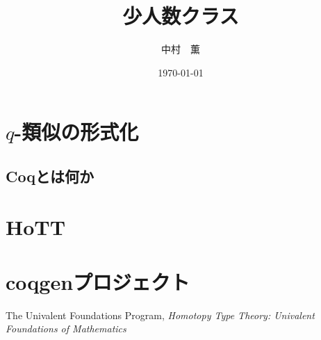 \documentclass[11pt]{jarticle}
\theoremstyle{mystyle}
\newcommand{\0}{\textbf{0}}
\newcommand{\1}{\textbf{1}}
\newcommand{\2}{\textbf{2}}
\begin{document}
\title{少人数クラス}
\author{中村　薫}
\date{\today}
\maketitle
\tableofcontents
\section{$q$-類似の形式化}
\subsection{Coqとは何か}
\section{HoTT}
\section{coqgenプロジェクト}
\begin{thebibliography}{9}
     The Univalent Foundations Program, 
        {\it{Homotopy Type Theory: Univalent Foundations of Mathematics}}
  \end{thebibliography}
\end{document}
